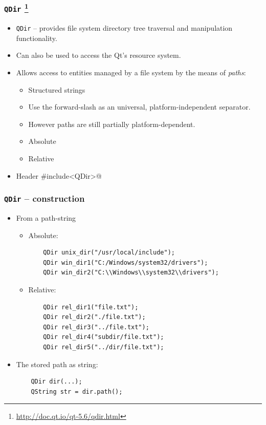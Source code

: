 \begin{frame}[fragile]
  \frametitle{\texttt{QDir}
    \footnote{\url{http://doc.qt.io/qt-5.6/qdir.html}}}
  \begin{itemize}
    \item \texttt{QDir} -- provides file system directory tree traversal and
     manipulation functionality.
    \item Can also be used to access the Qt's resource system.
    \item Allows access to entities managed by a file system by the means of
      {\em paths}:
      \begin{itemize}
        \item Structured strings
        \item Use the forward-slash \say{\texttt{/}} as an universal,
        platform-independent separator.
        \item However paths are still partially platform-dependent.
        \item Absolute
        \item Relative
      \end{itemize}
    \item Header \verb@#include<QDir>@
  \end{itemize}
\end{frame}

\begin{frame}[fragile]
  \frametitle{\texttt{QDir} -- construction}
  \small
  \begin{itemize}
    \item From a path-string
    \begin{itemize}
    \item Absolute:
    \begin{verbatim}
	QDir unix_dir("/usr/local/include");
	QDir win_dir1("C:/Windows/system32/drivers");
	QDir win_dir2("C:\\Windows\\system32\\drivers");
    \end{verbatim}
    \item Relative:
    \begin{verbatim}
	QDir rel_dir1("file.txt");
	QDir rel_dir2("./file.txt");
	QDir rel_dir3("../file.txt");
	QDir rel_dir4("subdir/file.txt");
	QDir rel_dir5("../dir/file.txt");
    \end{verbatim}
    \end{itemize}
    \item The stored path as string:
    \begin{verbatim}
	QDir dir(...);
	QString str = dir.path();
    \end{verbatim}
  \end{itemize}
\end{frame}

